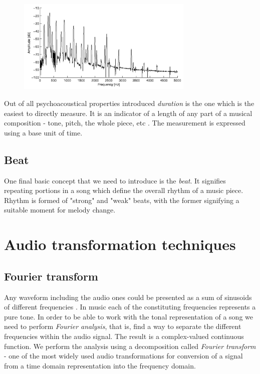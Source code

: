 \begin{figure}[H]
    \centering
    \includegraphics[width=0.75\textwidth]{BackgroundTheory/spectral_envelope}
    \label{fig:spectral-envelope}
\end{figure}

Out of all psychoacoustical properties introduced \textit{duration} is the one
which is the easiest to directly measure. It is an indicator of a length of any
part of a musical composition - tone, pitch, the whole piece, etc
\cite{benward2014music}. The measurement is expressed using a base unit of time.

\subsection{Beat}
\label{subsec:beat}
One final basic concept that we need to introduce is the \textit{beat}. It
signifies repeating portions in a song which define the overall rhythm of a
music piece. Rhythm is formed of "strong" and "weak" beats, with the former
signifying a suitable moment for melody change.

\section{Audio transformation techniques}
\label{sec:audiotransform}

\subsection{Fourier transform}
\label{subsec:fourier}
Any waveform including the audio ones could be presented as a sum of sinusoids
of different frequencies \cite{fouriertransform}. In music each of the
constituting frequencies represents a pure tone. In order to be able to work
with the tonal representation of a song we need to perform \textit{Fourier
analysis}, that is, find a way to separate the different frequencies within the
audio signal. The result is a complex-valued continuous function. We perform the
analysis using a decomposition called \textit{Fourier transform} - one of the
most widely used audio transformations for conversion of a signal from a time
domain representation into the frequency domain.

